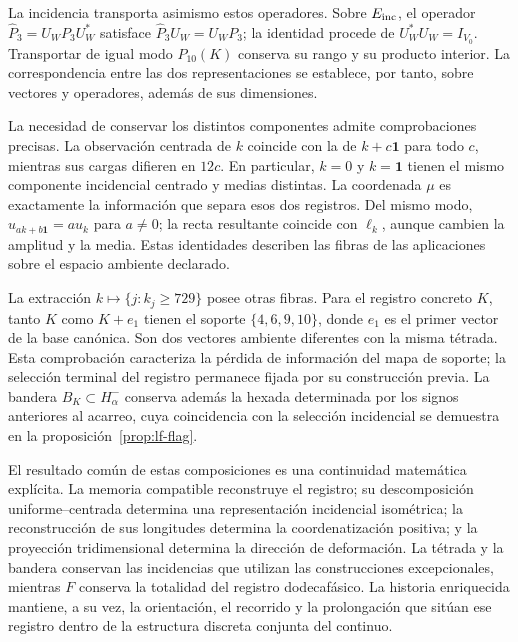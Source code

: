 La incidencia transporta asimismo estos operadores. Sobre
\(E_{\rm inc}\), el operador
\(\widehat P_3=U_WP_3U_W^*\) satisface
\(\widehat P_3U_W=U_WP_3\); la identidad procede de
\(U_W^*U_W=I_{V_0}\). Transportar de igual modo
\(P_{10}(K)\) conserva su rango y su producto interior.
La correspondencia entre las dos representaciones se establece,
por tanto, sobre vectores y operadores, además de sus dimensiones.

La necesidad de conservar los distintos componentes admite
comprobaciones precisas. La observación centrada de \(k\) coincide
con la de \(k+c\mathbf1\) para todo \(c\), mientras sus
cargas difieren en \(12c\). En particular, \(k=0\) y
\(k=\mathbf1\) tienen el mismo componente incidencial centrado
y medias distintas. La coordenada \(\mu\) es exactamente la
información que separa esos dos registros. Del mismo modo,
\(u_{ak+b\mathbf1}=a u_k\) para \(a\ne0\); la recta
resultante coincide con \(\ell_k\), aunque cambien la amplitud
y la media. Estas identidades describen las fibras de las
aplicaciones sobre el espacio ambiente declarado.

La extracción \(k\mapsto\{j:k_j\geq729\}\) posee otras
fibras. Para el registro concreto \(K\), tanto \(K\) como
\(K+e_1\) tienen el soporte \(\{4,6,9,10\}\), donde
\(e_1\) es el primer vector de la base canónica. Son dos vectores
ambiente diferentes con la misma tétrada. Esta comprobación
caracteriza la pérdida de información del mapa de soporte; la
selección terminal del registro permanece fijada por su
construcción previa. La bandera
\(B_K\subset H^-_\alpha\) conserva además la hexada determinada
por los signos anteriores al acarreo, cuya coincidencia con la
selección incidencial se demuestra en la
proposición~\ref{prop:lf-flag}.

El resultado común de estas composiciones es una continuidad
matemática explícita. La memoria compatible reconstruye el registro;
su descomposición uniforme--centrada determina una representación
incidencial isométrica; la reconstrucción de sus longitudes determina
la coordenatización positiva; y la proyección tridimensional determina la
dirección de deformación. La tétrada y la bandera conservan las
incidencias que utilizan las construcciones excepcionales, mientras
\(F\) conserva la totalidad del registro dodecafásico. La historia
enriquecida mantiene, a su vez, la orientación, el recorrido y la
prolongación que sitúan ese registro dentro de la estructura
discreta conjunta del continuo.
